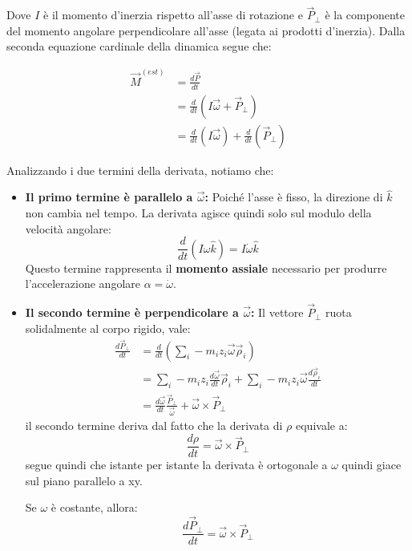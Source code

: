 \documentclass[11pt, a4paper, openright]{book}
\theoremstyle{plain}
\theoremstyle{definition}
\begin{document}
Dove $I$ è il momento d'inerzia rispetto all'asse di rotazione e $\vec{P}_\perp$ è la componente del momento angolare perpendicolare all'asse (legata ai prodotti d'inerzia). Dalla seconda equazione cardinale della dinamica segue che:

\begin{align}
    \vec{M}^{(est)} & = \frac{d\vec{P}}{dt} \\
                    & = \frac{d}{dt}(I \vec{\omega} + \vec{P}_\perp) \\
                    & = \frac{d}{dt}(I \vec{\omega}) + \frac{d}{dt}(\vec{P}_\perp)
\end{align}

Analizzando i due termini della derivata, notiamo che:

\begin{itemize}
    \item \textbf{Il primo termine è parallelo a $\vec{\omega}$:} 
    Poiché l'asse è fisso, la direzione di $\hat{k}$ non cambia nel tempo. La derivata agisce quindi solo sul modulo della velocità angolare:
    \begin{equation}
        \frac{d}{dt}(I \omega \hat{k}) = I \dot{\omega} \hat{k}
    \end{equation}
    Questo termine rappresenta il \textbf{momento assiale} necessario per produrre l'accelerazione angolare $\alpha = \dot{\omega}$.

    \item \textbf{Il secondo termine è perpendicolare a $\vec{\omega}$:} 
    Il vettore $\vec{P}_\perp$ ruota solidalmente al corpo rigido, vale:
    \begin{align}
        \frac{d\vec{P}_\perp}{dt} & = \frac{d}{dt}(\sum_i -m_iz_i\vec{\omega}\vec{\rho}_i) \\
                                  & = \sum_i -m_i z_i \frac{d\vec{\omega}}{dt}\vec{\rho}_i + \sum_i -m_i z_i \vec{\omega} \frac{d\vec{\rho}_i}{dt} \\
                                  & = \frac{d\vec{\omega}}{dt} \frac{\vec{P}_\perp}{\vec{\omega}} + \vec{\omega} \times \vec{P}_\perp
    \end{align}
    il secondo termine deriva dal fatto che la derivata di $\rho$ equivale a:
    \begin{equation}
        \frac{d\rho}{dt} = \vec{\omega} \times \vec{P}_\perp
    \end{equation}
    segue quindi che istante per istante la derivata è ortogonale a $\omega$ quindi giace sul piano parallelo a xy.

    Se $\omega$ è costante, allora:
    \begin{equation}
        \frac{d\vec{P}_\perp}{dt} = \vec{\omega} \times \vec{P}_\perp
    \end{equation}
\end{itemize}
\end{document}
